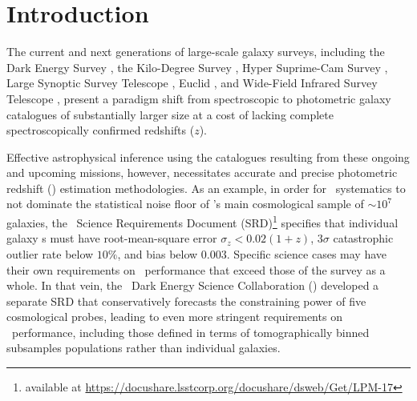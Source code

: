 \section{Introduction}

The current and next generations of large-scale galaxy surveys, including the Dark Energy Survey \citep[\des,][]{Abbott:05}, the Kilo-Degree Survey \citep[\kids,][]{de_Jong:13}, Hyper Suprime-Cam Survey \citep[\hsc,][]{Aihara:2018a,Aihara:2018b}, Large Synoptic Survey Telescope \citep[\lsst,][]{Abell:09}, Euclid \citep{Laureijs:11}, and Wide-Field Infrared Survey Telescope \citep[\wfirst,][]{Green:12}, present a paradigm shift from spectroscopic to photometric galaxy catalogues of substantially larger size at a cost of lacking complete spectroscopically confirmed redshifts ($z$).

Effective astrophysical inference using the catalogues resulting from these ongoing and upcoming missions, however, necessitates accurate and precise photometric redshift (\pz) estimation methodologies.
As an example, in order for \pz\ systematics to not dominate the statistical noise floor of \lsst's main cosmological sample of $\sim 10^{7}$ galaxies, the \lsst\ Science Requirements Document (SRD)\footnote{available at \url{https://docushare.lsstcorp.org/docushare/dsweb/Get/LPM-17}} specifies that individual galaxy \pz s must have root-mean-square error $\sigma_z < 0.02 (1+z)$, $3 \sigma$ catastrophic outlier rate below $10\%$, and bias below $0.003$.
Specific science cases may have their own requirements on \pz\ performance that exceed those of the survey as a whole.
In that vein, the \lsst\ Dark Energy Science Collaboration (\desc) developed a separate SRD \citep{Mandelbaum:2018} that conservatively forecasts the constraining power of five cosmological probes, leading to even more stringent requirements on \pz\ performance, including those defined in terms of tomographically binned subsamples populations rather than individual galaxies.

